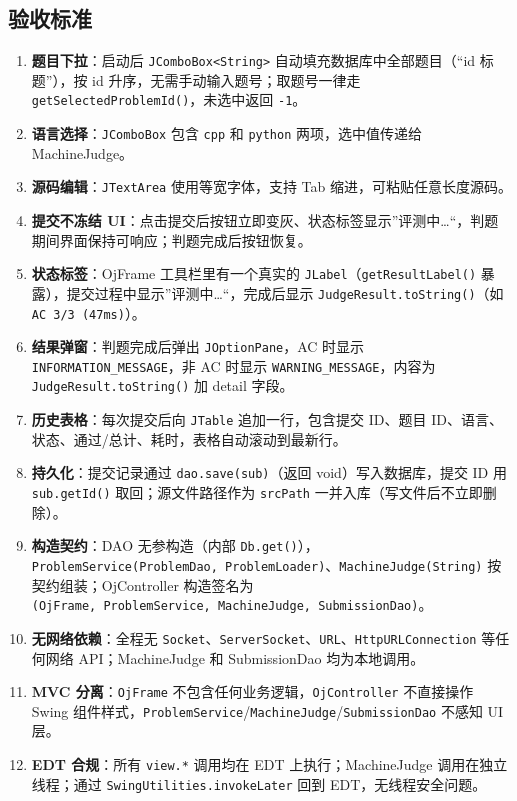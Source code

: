 \documentclass[
  11pt,
]{ctexart}
\providecommand{\tightlist}{%
  \setlength{\itemsep}{0pt}\setlength{\parskip}{0pt}}
\begin{document}
\hypertarget{ux9a8cux6536ux6807ux51c6-7}{%
\subsection{验收标准}\label{ux9a8cux6536ux6807ux51c6-7}}

\begin{enumerate}
\def\labelenumi{\arabic{enumi}.}
\tightlist
\item
  \textbf{题目下拉}：启动后
  \texttt{JComboBox\textless{}String\textgreater{}}
  自动填充数据库中全部题目（``id 标题''），按 id
  升序，无需手动输入题号；取题号一律走
  \texttt{getSelectedProblemId()}，未选中返回 \texttt{-1}。
\item
  \textbf{语言选择}：\texttt{JComboBox} 包含 \texttt{cpp} 和
  \texttt{python} 两项，选中值传递给 MachineJudge。
\item
  \textbf{源码编辑}：\texttt{JTextArea} 使用等宽字体，支持 Tab
  缩进，可粘贴任意长度源码。
\item
  \textbf{提交不冻结
  UI}：点击提交后按钮立即变灰、状态标签显示''评测中\ldots``，判题期间界面保持可响应；判题完成后按钮恢复。
\item
  \textbf{状态标签}：OjFrame 工具栏里有一个真实的
  \texttt{JLabel}（\texttt{getResultLabel()}
  暴露），提交过程中显示''评测中\ldots``，完成后显示
  \texttt{JudgeResult.toString()}（如 \texttt{AC\ 3/3\ (47ms)}）。
\item
  \textbf{结果弹窗}：判题完成后弹出 \texttt{JOptionPane}，AC 时显示
  \texttt{INFORMATION\_MESSAGE}，非 AC 时显示
  \texttt{WARNING\_MESSAGE}，内容为 \texttt{JudgeResult.toString()} 加
  detail 字段。
\item
  \textbf{历史表格}：每次提交后向 \texttt{JTable} 追加一行，包含提交
  ID、题目 ID、语言、状态、通过/总计、耗时，表格自动滚动到最新行。
\item
  \textbf{持久化}：提交记录通过 \texttt{dao.save(sub)}（返回
  void）写入数据库，提交 ID 用 \texttt{sub.getId()} 取回；源文件路径作为
  \texttt{srcPath} 一并入库（写文件后不立即删除）。
\item
  \textbf{构造契约}：DAO 无参构造（内部
  \texttt{Db.get()}），\texttt{ProblemService(ProblemDao,\ ProblemLoader)}、\texttt{MachineJudge(String)}
  按契约组装；OjController 构造签名为
  \texttt{(OjFrame,\ ProblemService,\ MachineJudge,\ SubmissionDao)}。
\item
  \textbf{无网络依赖}：全程无
  \texttt{Socket}、\texttt{ServerSocket}、\texttt{URL}、\texttt{HttpURLConnection}
  等任何网络 API；MachineJudge 和 SubmissionDao 均为本地调用。
\item
  \textbf{MVC 分离}：\texttt{OjFrame}
  不包含任何业务逻辑，\texttt{OjController} 不直接操作 Swing
  组件样式，\texttt{ProblemService}/\texttt{MachineJudge}/\texttt{SubmissionDao}
  不感知 UI 层。
\item
  \textbf{EDT 合规}：所有 \texttt{view.*} 调用均在 EDT
  上执行；MachineJudge 调用在独立线程；通过
  \texttt{SwingUtilities.invokeLater} 回到 EDT，无线程安全问题。
\end{enumerate}
\end{document}
